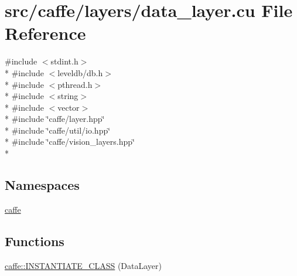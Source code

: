 \hypertarget{data__layer_8cu}{\section{src/caffe/layers/data\+\_\+layer.cu File Reference}
\label{data__layer_8cu}
}
{\ttfamily \#include $<$stdint.\+h$>$}\\*
{\ttfamily \#include $<$leveldb/db.\+h$>$}\\*
{\ttfamily \#include $<$pthread.\+h$>$}\\*
{\ttfamily \#include $<$string$>$}\\*
{\ttfamily \#include $<$vector$>$}\\*
{\ttfamily \#include \char`\"{}caffe/layer.\+hpp\char`\"{}}\\*
{\ttfamily \#include \char`\"{}caffe/util/io.\+hpp\char`\"{}}\\*
{\ttfamily \#include \char`\"{}caffe/vision\+\_\+layers.\+hpp\char`\"{}}\\*
\subsection*{Namespaces}
\begin{DoxyCompactItemize}
\item 
 \hyperlink{namespacecaffe}{caffe}
\end{DoxyCompactItemize}
\subsection*{Functions}
\begin{DoxyCompactItemize}
\item 
\hyperlink{namespacecaffe_a0e7276cce32956a506510b7879de1d0f}{caffe\+::\+I\+N\+S\+T\+A\+N\+T\+I\+A\+T\+E\+\_\+\+C\+L\+A\+S\+S} (Data\+Layer)
\end{DoxyCompactItemize}
